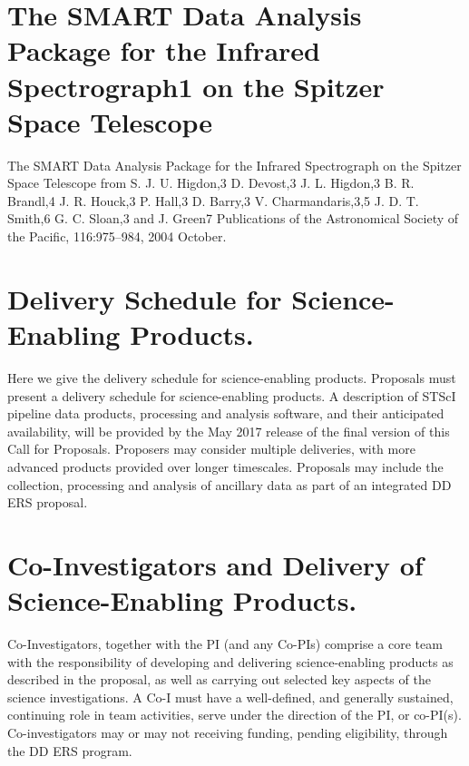 \section{The SMART Data Analysis Package for the Infrared Spectrograph1 on the Spitzer Space Telescope}
The SMART Data Analysis Package for the Infrared Spectrograph on the
Spitzer Space Telescope from S. J. U. Higdon,3 D. Devost,3
J. L. Higdon,3 B. R. Brandl,4 J. R. Houck,3 P. Hall,3 D. Barry,3
V. Charmandaris,3,5 J. D. T. Smith,6 G. C. Sloan,3 and J. Green7
Publications of the Astronomical Society of the Pacific, 116:975–984,
2004 October.

\section{Delivery Schedule for Science-Enabling Products.} 
Here we give the delivery schedule for science-enabling products. 
Proposals must present a delivery schedule for science-enabling products. A description of STScI pipeline data products, processing and analysis software, and their anticipated availability, will be provided by the May 2017 release of the final version of this Call for Proposals.  Proposers may consider multiple deliveries, with more advanced products provided over longer timescales. Proposals may include the collection, processing and analysis of ancillary data as part of an integrated DD ERS proposal.

\section{Co-Investigators and Delivery of Science-Enabling Products.}
Co-Investigators, together with the PI (and any Co-PIs) comprise a core team with the responsibility of developing and delivering science-enabling products as described in the proposal, as well as carrying out selected key aspects of the science investigations.  A Co-I must have a well-defined, and generally sustained, continuing role in team activities, serve under the direction of the PI, or co-PI(s). Co-investigators may or may not receiving funding, pending eligibility, through the DD ERS program. 

